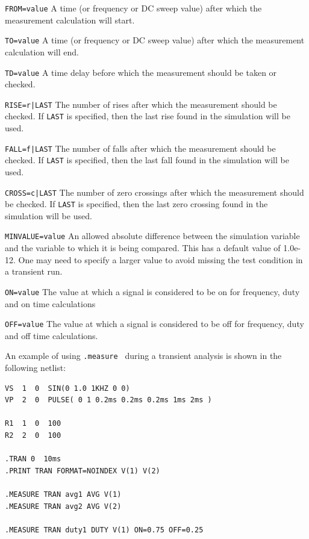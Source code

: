 \begin{XyceItemize}
\item \texttt{FROM=value} A time (or frequency or DC sweep value) after which the 
measurement calculation will start.

\item \texttt{TO=value} A time (or frequency or DC sweep value) after which the 
measurement calculation will end.

\item \texttt{TD=value} A time delay before which the measurement should be taken or checked.

\item \texttt{RISE=r|LAST}  The number of rises after which the measurement should be checked.  If
\texttt{LAST} is specified, then the last rise found in the simulation will be used.

\item \texttt{FALL=f|LAST}
  The number of falls after which the measurement should be checked.  If
  \texttt{LAST} is specified, then the last fall found in the simulation
  will be used.

\item \texttt{CROSS=c|LAST} 
  The number of zero crossings after which the measurement should be checked.  If
  \texttt{LAST} is specified, then the last zero crossing found in the simulation
  will be used.

\item \texttt{MINVALUE=value}
  An allowed absolute difference between the simulation variable and the variable
  to which it is being compared.  This has a default value of 1.0e-12.  One 
  may need to specify a larger value to avoid missing the test condition
  in a transient run.

\item \texttt{ON=value}
  The value at which a signal is considered to be on for frequency, duty and
  on time calculations

\item \texttt{OFF=value}
  The value at which a signal is considered to be off for frequency, duty and
  off time calculations.

\end{XyceItemize}

An example of using \texttt{.measure } during a transient analysis is shown in the following netlist:

\begin{verbatim}
VS  1  0  SIN(0 1.0 1KHZ 0 0)
VP  2  0  PULSE( 0 1 0.2ms 0.2ms 0.2ms 1ms 2ms )

R1  1  0  100
R2  2  0  100

.TRAN 0  10ms
.PRINT TRAN FORMAT=NOINDEX V(1) V(2) 

.MEASURE TRAN avg1 AVG V(1)
.MEASURE TRAN avg2 AVG V(2)

.MEASURE TRAN duty1 DUTY V(1) ON=0.75 OFF=0.25

\end{verbatim}

